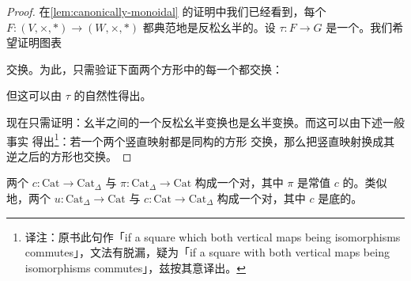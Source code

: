 \begin{proof}
在\cref{lem:canonically-monoidal} 的证明中我们已经看到，每个\trFunctor{}%
$F\colon (V, \times, *) \to (W, \times, *)$ 都典范地是反松幺半的。设
$\tau\colon F \to G$ 是一个\trNaturalTransformation{}。我们希望证明图表
\begin{center}
\end{center}
交换。为此，只需验证下面两个方形中的每一个都交换：
\begin{center}
\end{center}
但这可以由 $\tau$ 的自然性得出。

现在只需证明：幺半\trFunctor{}之间的一个反松幺半变换也是幺半变换。而这可以由下述一般事实
得出\footnote{译注：原书此句作「if a square which both vertical maps being
isomorphisms commutes」，文法有脱漏，疑为「if a square with both vertical maps
being isomorphisms commutes」，兹按其意译出。}：若一个两个竖直映射都是同构的方形
交换，那么把竖直映射换成其逆之后的方形也交换。
\end{proof}

\begin{corollary}\label{cor:adjoint-pairs-cat-delta}
两个\trFunctor{} $c\colon \mathrm{Cat} \to \mathrm{Cat}_{\Delta}$ 与
$\pi\colon \mathrm{Cat}_{\Delta} \to \mathrm{Cat}$ 构成一个\trAdjunction{}对，其中 $\pi$ 是常值\trFunctor{} $c$ 的\trLeftAdjoint{}。类似地，两个\trFunctor{}%
$u\colon \mathrm{Cat}_{\Delta} \to \mathrm{Cat}$ 与
$c\colon \mathrm{Cat} \to \mathrm{Cat}_{\Delta}$ 构成一个\trAdjunction{}对，其中 $c$ 是底\trFunctor{}的\trLeftAdjoint{}。
\end{corollary}


